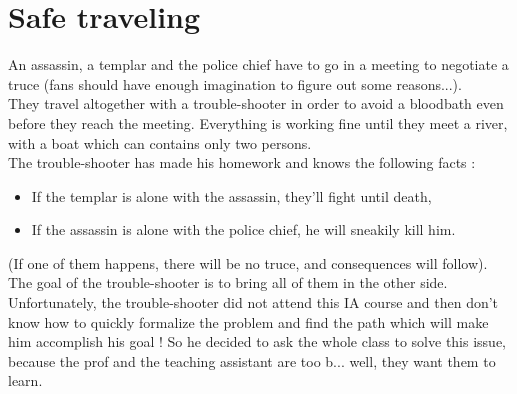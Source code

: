 \documentclass[11pt,a4paper,BCOR12mm, headexclude, footexclude, twoside, openright]{scrartcl}
\numberwithin{equation}{section} %
\numberwithin{figure}{section} %
\numberwithin{table}{section} %
\begin{document}
\begin{center}
\end{center}

\section{Safe traveling}

An assassin, a templar and the police chief have to go in a meeting to negotiate a truce (fans should have enough imagination to figure out some reasons...).\\

They travel altogether with a trouble-shooter in order to avoid a bloodbath even before they reach the meeting. Everything is working fine until they meet a river, with a boat which can contains only two persons.\\

The trouble-shooter has made his homework and knows the following facts : 

\begin{itemize}
	\item If the templar is alone with the assassin, they'll fight until death,
    \item If the assassin is alone with the police chief, he will sneakily kill him. 
\end{itemize}

(If one of them happens, there will be no truce, and consequences will follow).\\

The goal of the trouble-shooter is to bring all of them in the other side.\\

Unfortunately, the trouble-shooter did not attend this IA course and then don't know how to quickly formalize the problem and find the path which will make him accomplish his goal ! So he decided to ask the whole class to solve this issue, because the prof and the teaching assistant are too b... well, they want them to learn.\\
\end{document}
